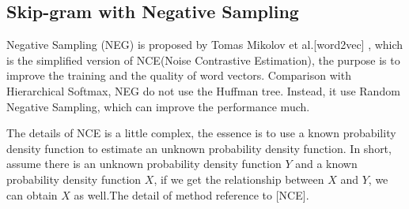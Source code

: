 \subsection{Skip-gram with Negative Sampling}

Negative Sampling (NEG) is proposed by Tomas Mikolov et al.[word2vec]  , which is the simplified version of NCE(Noise Contrastive Estimation), the purpose is to improve the training and the quality of word vectors. Comparison with Hierarchical Softmax, NEG do not use the Huffman tree. Instead, it use Random Negative Sampling, which can improve the performance much.

The details of NCE is a little complex, the essence is to use a known probability density function to estimate an unknown probability density function. In short, assume there is an unknown probability density function $Y$ and a known probability density function $X$, if we get the relationship between $X$ and $Y$, we can obtain $X$ as well.The detail of method reference to [NCE]. 

